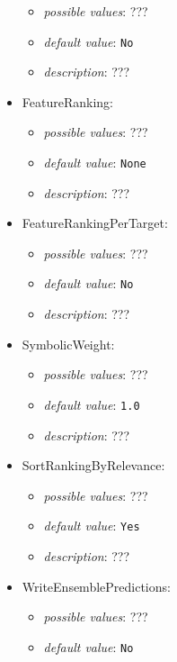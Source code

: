 \documentclass{article}
\begin{document}
\begin{itemize}
           \begin{itemize}
                \item \emph{possible values}: ???
                \item \emph{default value}: \texttt{No}
                \item \emph{description}: ???
           \end{itemize}
    \item FeatureRanking:
           \begin{itemize}
                \item \emph{possible values}: ???
                \item \emph{default value}: \texttt{None}
                \item \emph{description}: ???
           \end{itemize}
    \item FeatureRankingPerTarget:
           \begin{itemize}
                \item \emph{possible values}: ???
                \item \emph{default value}: \texttt{No}
                \item \emph{description}: ???
           \end{itemize}
    \item SymbolicWeight:
           \begin{itemize}
                \item \emph{possible values}: ???
                \item \emph{default value}: \texttt{1.0}
                \item \emph{description}: ???
           \end{itemize}
    \item SortRankingByRelevance:
           \begin{itemize}
                \item \emph{possible values}: ???
                \item \emph{default value}: \texttt{Yes}
                \item \emph{description}: ???
           \end{itemize}
    \item WriteEnsemblePredictions:
           \begin{itemize}
                \item \emph{possible values}: ???
                \item \emph{default value}: \texttt{No}

\end{itemize}
\end{itemize}
\end{document}
